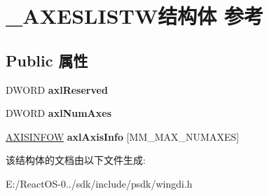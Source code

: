 \hypertarget{struct___a_x_e_s_l_i_s_t_w}{}\section{\+\_\+\+A\+X\+E\+S\+L\+I\+S\+T\+W结构体 参考}
\label{struct___a_x_e_s_l_i_s_t_w}
\subsection*{Public 属性}
\begin{DoxyCompactItemize}
\item 
\mbox{\label{struct___a_x_e_s_l_i_s_t_w_a6c333f547ff4745874a629a27aa8472f}} 
D\+W\+O\+RD {\bfseries axl\+Reserved}
\item 
\mbox{\label{struct___a_x_e_s_l_i_s_t_w_a652a4499f0c66bb116ab645ee7243e86}} 
D\+W\+O\+RD {\bfseries axl\+Num\+Axes}
\item 
\mbox{\label{struct___a_x_e_s_l_i_s_t_w_a4021259d67c5749513952dbd41cd2812}} 
\hyperlink{struct___a_x_i_s_i_n_f_o_w}{A\+X\+I\+S\+I\+N\+F\+OW} {\bfseries axl\+Axis\+Info} \mbox{[}M\+M\+\_\+\+M\+A\+X\+\_\+\+N\+U\+M\+A\+X\+ES\mbox{]}
\end{DoxyCompactItemize}


该结构体的文档由以下文件生成\+:\begin{DoxyCompactItemize}
\item 
E\+:/\+React\+O\+S-\/0../sdk/include/psdk/wingdi.\+h\end{DoxyCompactItemize}
